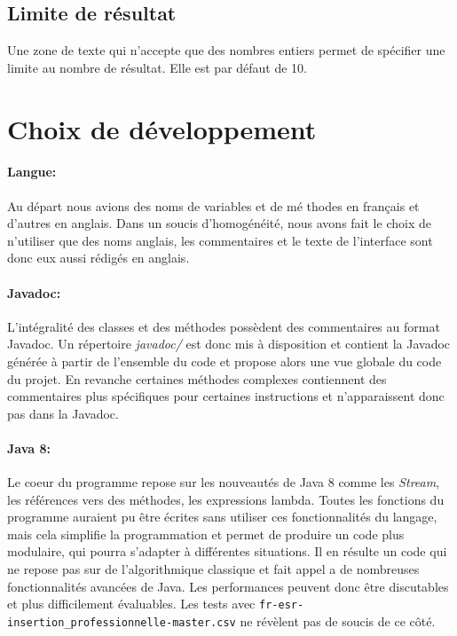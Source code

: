 \documentclass{article}
\begin{document}
\subsection{Limite de résultat}

Une zone de texte qui n'accepte que des nombres entiers permet de spécifier une limite au nombre de résultat. Elle est par défaut de 10.

\section{Choix de développement}

\paragraph{Langue:} Au départ nous avions des noms de variables et de mé thodes en français et d'autres en anglais. Dans un soucis d'homogénéité, nous avons fait le choix de n'utiliser que des noms anglais, les commentaires et le texte de l'interface sont donc eux aussi rédigés en anglais.

\paragraph{Javadoc:} L'intégralité des classes et des méthodes possèdent des commentaires au format Javadoc. Un répertoire \textit{javadoc/} est donc mis à disposition et contient la Javadoc générée à partir de l'ensemble du code et propose alors une vue globale du code du projet. En revanche certaines méthodes complexes contiennent des commentaires plus spécifiques pour certaines instructions et n'apparaissent donc pas dans la Javadoc.

\paragraph{Java 8:} Le coeur du programme repose sur les nouveautés de Java 8 comme les \textit{Stream}, les références vers des méthodes, les expressions lambda. Toutes les fonctions du programme auraient pu être écrites sans utiliser ces fonctionnalités du langage, mais cela simplifie la programmation et permet de produire un code plus modulaire, qui pourra s'adapter à différentes situations. Il en résulte un code qui ne repose pas sur de l'algorithmique classique et fait appel a de nombreuses fonctionnalités avancées de Java. Les performances peuvent donc être discutables et plus difficilement évaluables. Les tests avec \texttt{fr-esr-insertion\_professionnelle-master.csv} ne révèlent pas de soucis de ce côté.
\end{document}
